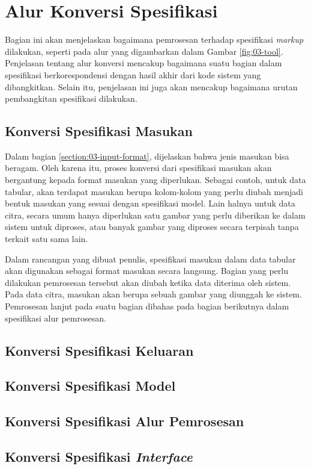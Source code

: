 \section{Alur Konversi Spesifikasi}

Bagian ini akan menjelaskan bagaimana pemrosesan terhadap spesifikasi \textit{markup} dilakukan, seperti pada alur yang digambarkan dalam Gambar \ref{fig:03-tool}.
Penjelasan tentang alur konversi mencakup bagaimana suatu bagian dalam spesifikasi berkorespondensi dengan hasil akhir dari kode sistem yang dibangkitkan.
Selain itu, penjelasan ini juga akan mencakup bagaimana urutan pembangkitan spesifikasi dilakukan.

\subsection{Konversi Spesifikasi Masukan}

Dalam bagian \ref{section:03-input-format}, dijelaskan bahwa jenis masukan bisa beragam.
Oleh karena itu, proses konversi dari spesifikasi masukan akan bergantung kepada format masukan yang diperlukan.
Sebagai contoh, untuk data tabular, akan terdapat masukan berupa kolom-kolom yang perlu diubah menjadi bentuk masukan yang sesuai dengan spesifikasi model.
Lain halnya untuk data citra, secara umum hanya diperlukan satu gambar yang perlu diberikan ke dalam sistem untuk diproses, atau banyak gambar yang diproses secara terpisah tanpa terkait satu sama lain.

Dalam rancangan yang dibuat penulis, spesifikasi masukan dalam data tabular akan digunakan sebagai format masukan secara langsung.
Bagian yang perlu dilakukan pemrosesan tersebut akan diubah ketika data diterima oleh sistem.
Pada data citra, masukan akan berupa sebuah gambar yang diunggah ke sistem.
Pemrosesan lanjut pada suatu bagian dibahas pada bagian berikutnya dalam spesifikasi alur pemrosesan. 

\subsection{Konversi Spesifikasi Keluaran}


\subsection{Konversi Spesifikasi Model}

\subsection{Konversi Spesifikasi Alur Pemrosesan}

\subsection{Konversi Spesifikasi \textit{Interface}}
